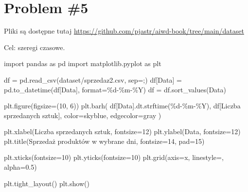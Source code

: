 \documentclass[
  polish,
  letterpaper,
  DIV=11,
  numbers=noendperiod]{scrreprt}
\newenvironment{Shaded}{\begin{snugshade}}{\end{snugshade}}
\newcommand{\BuiltInTok}[1]{\textcolor[rgb]{0.00,0.23,0.31}{#1}}
\newcommand{\DecValTok}[1]{\textcolor[rgb]{0.68,0.00,0.00}{#1}}
\newcommand{\FloatTok}[1]{\textcolor[rgb]{0.68,0.00,0.00}{#1}}
\newcommand{\ImportTok}[1]{\textcolor[rgb]{0.00,0.46,0.62}{#1}}
\newcommand{\NormalTok}[1]{\textcolor[rgb]{0.00,0.23,0.31}{#1}}
\newcommand{\OperatorTok}[1]{\textcolor[rgb]{0.37,0.37,0.37}{#1}}
\newcommand{\SpecialCharTok}[1]{\textcolor[rgb]{0.37,0.37,0.37}{#1}}
\newcommand{\StringTok}[1]{\textcolor[rgb]{0.13,0.47,0.30}{#1}}
\begin{document}
\chapter{Problem \#5}\label{problem-5}

Pliki są dostępne tutaj
\url{https://github.com/pjastr/aiwd-book/tree/main/dataset}

Cel: szeregi czasowe.

\begin{Shaded}
\begin{Highlighting}[]
\ImportTok{import}\NormalTok{ pandas }\ImportTok{as}\NormalTok{ pd}
\ImportTok{import}\NormalTok{ matplotlib.pyplot }\ImportTok{as}\NormalTok{ plt}

\NormalTok{df }\OperatorTok{=}\NormalTok{ pd.read\_csv(}\StringTok{\textquotesingle{}dataset/sprzedaz2.csv\textquotesingle{}}\NormalTok{, sep}\OperatorTok{=}\StringTok{\textquotesingle{};\textquotesingle{}}\NormalTok{)}
\NormalTok{df[}\StringTok{\textquotesingle{}Data\textquotesingle{}}\NormalTok{] }\OperatorTok{=}\NormalTok{ pd.to\_datetime(df[}\StringTok{\textquotesingle{}Data\textquotesingle{}}\NormalTok{], }\BuiltInTok{format}\OperatorTok{=}\StringTok{\textquotesingle{}}\SpecialCharTok{\%d}\StringTok{{-}\%m{-}\%Y\textquotesingle{}}\NormalTok{)}
\NormalTok{df }\OperatorTok{=}\NormalTok{ df.sort\_values(}\StringTok{\textquotesingle{}Data\textquotesingle{}}\NormalTok{)}

\NormalTok{plt.figure(figsize}\OperatorTok{=}\NormalTok{(}\DecValTok{10}\NormalTok{, }\DecValTok{6}\NormalTok{))}
\NormalTok{plt.barh(}
\NormalTok{    df[}\StringTok{\textquotesingle{}Data\textquotesingle{}}\NormalTok{].dt.strftime(}\StringTok{\textquotesingle{}}\SpecialCharTok{\%d}\StringTok{{-}\%m{-}\%Y\textquotesingle{}}\NormalTok{),}
\NormalTok{    df[}\StringTok{\textquotesingle{}Liczba sprzedanych sztuk\textquotesingle{}}\NormalTok{],}
\NormalTok{    color}\OperatorTok{=}\StringTok{\textquotesingle{}skyblue\textquotesingle{}}\NormalTok{,}
\NormalTok{    edgecolor}\OperatorTok{=}\StringTok{\textquotesingle{}gray\textquotesingle{}}
\NormalTok{)}

\NormalTok{plt.xlabel(}\StringTok{\textquotesingle{}Liczba sprzedanych sztuk\textquotesingle{}}\NormalTok{, fontsize}\OperatorTok{=}\DecValTok{12}\NormalTok{)}
\NormalTok{plt.ylabel(}\StringTok{\textquotesingle{}Data\textquotesingle{}}\NormalTok{, fontsize}\OperatorTok{=}\DecValTok{12}\NormalTok{)}
\NormalTok{plt.title(}\StringTok{\textquotesingle{}Sprzedaż produktów w wybrane dni\textquotesingle{}}\NormalTok{, fontsize}\OperatorTok{=}\DecValTok{14}\NormalTok{, pad}\OperatorTok{=}\DecValTok{15}\NormalTok{)}

\NormalTok{plt.xticks(fontsize}\OperatorTok{=}\DecValTok{10}\NormalTok{)}
\NormalTok{plt.yticks(fontsize}\OperatorTok{=}\DecValTok{10}\NormalTok{)}
\NormalTok{plt.grid(axis}\OperatorTok{=}\StringTok{\textquotesingle{}x\textquotesingle{}}\NormalTok{, linestyle}\OperatorTok{=}\StringTok{\textquotesingle{}{-}{-}\textquotesingle{}}\NormalTok{, alpha}\OperatorTok{=}\FloatTok{0.5}\NormalTok{)}

\NormalTok{plt.tight\_layout()}
\NormalTok{plt.show()}
\end{Highlighting}
\end{Shaded}
\end{document}
